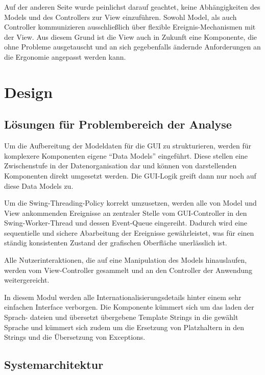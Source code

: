         Auf der anderen Seite wurde peinlichst darauf geachtet, keine
        Abhängigkeiten des Models und des Controllers zur View einzuführen.
        Sowohl Model, als auch Controller kommunizieren ausschließlich über
        flexible Ereignis-Mechanismen mit der View. Aus diesem Grund ist die
        View auch in Zukunft eine Komponente, die ohne Probleme ausgetauscht und
        an sich gegebenfalls ändernde Anforderungen an die Ergonomie angepasst
        werden kann.

\chapter{Design}

    \section{Lösungen für Problembereich der Analyse}
    
        Um die Aufbereitung der Modeldaten für die GUI zu strukturieren,
        werden für komplexere Komponenten eigene "`Data Models"' eingeführt.
        Diese stellen eine Zwischenstufe in der Datenorganisation dar und können
        von darstellenden Komponenten direkt umgesetzt werden. Die GUI-Logik
        greift dann nur noch auf diese Data Models zu.
        
        Um die Swing-Threading-Policy korrekt umzusetzen, werden alle von Model
        und View ankommenden Ereignisse an zentraler Stelle vom GUI-Controller
        in den Swing-Worker-Thread und dessen Event-Queue eingereiht. Dadurch wird eine
        sequentielle und sichere Abarbeitung der Ereignisse gewährleistet, was
        für einen ständig konsistenten Zustand der grafischen Oberfläche
        unerlässlich ist.
        
        Alle Nutzerinteraktionen, die auf eine Manipulation des Models
        hinauslaufen, werden vom View-Controller gesammelt und an den Controller
        der Anwendung weitergereicht.
        
        In diesem Modul werden alle Internationalisierungsdetails hinter einem sehr
        einfachen Interface verborgen. Die Komponente kümmert sich um das laden der Sprach-
        dateien und übersetzt übergebene Template Strings in die gewählt Sprache und kümmert
        sich zudem um die Ersetzung von Platzhaltern in den Strings und die Übersetzung von
        Exceptions.
    
    \section{Systemarchitektur}
    
